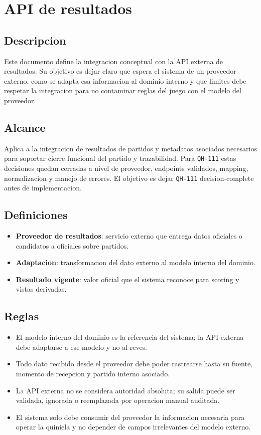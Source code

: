 \section{API de resultados}

\subsection{Descripcion}

Este documento define la integracion conceptual con la API externa de resultados. Su objetivo es dejar claro que espera el sistema de un proveedor externo, como se adapta esa informacion al dominio interno y que limites debe respetar la integracion para no contaminar reglas del juego con el modelo del proveedor.

\subsection{Alcance}

Aplica a la integracion de resultados de partidos y metadatos asociados necesarios para soportar cierre funcional del partido y trazabilidad. Para \texttt{QH-111} estas decisiones quedan cerradas a nivel de proveedor, endpoints validados, mapping, normalizacion y manejo de errores. El objetivo es dejar \texttt{QH-111} decision-complete antes de implementacion.

\subsection{Definiciones}

\begin{itemize}
  \item \textbf{Proveedor de resultados}: servicio externo que entrega datos oficiales o candidatos a oficiales sobre partidos.
  \item \textbf{Adaptacion}: transformacion del dato externo al modelo interno del dominio.
  \item \textbf{Resultado vigente}: valor oficial que el sistema reconoce para scoring y vistas derivadas.
\end{itemize}

\subsection{Reglas}

\begin{itemize}
  \item El modelo interno del dominio es la referencia del sistema; la API externa debe adaptarse a ese modelo y no al reves.
  \item Todo dato recibido desde el proveedor debe poder rastrearse hasta su fuente, momento de recepcion y partido interno asociado.
  \item La API externa no se considera autoridad absoluta; su salida puede ser validada, ignorada o reemplazada por operacion manual auditada.
  \item El sistema solo debe consumir del proveedor la informacion necesaria para operar la quiniela y no depender de campos irrelevantes del modelo externo.
\end{itemize}

